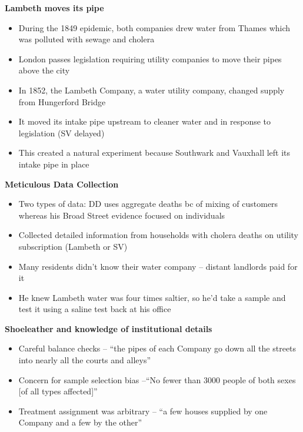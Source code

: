 \documentclass[notes=show]{beamer}
\begin{document}
\begin{frame}[plain]
\begin{center}
\textbf{Lambeth moves its pipe}
\end{center}

\begin{itemize}
\item During the 1849 epidemic, both companies drew water from Thames which was polluted with sewage and cholera
\item London passes legislation requiring utility companies to move their pipes above the city
\item In 1852, the Lambeth Company, a water utility company, changed supply from Hungerford Bridge
\item It moved its intake pipe upstream to cleaner water and in response to legislation (SV delayed)
\item This created a natural experiment because Southwark and Vauxhall left its intake pipe in place
\end{itemize}

\end{frame}



\begin{frame}[plain]
\begin{center}
\textbf{Meticulous Data Collection}
\end{center}

\begin{itemize}
\item Two types of data: DD uses aggregate deaths bc of mixing of customers whereas his Broad Street evidence focused on individuals
\item Collected detailed information from households with cholera deaths on utility subscription (Lambeth or SV)
\item Many residents didn't know their water company -- distant landlords paid for it
\item He knew Lambeth water was four times saltier, so he'd take a sample and test it using a saline test back at his office
\end{itemize}

\end{frame}


\begin{frame}[plain]
\begin{center}
\textbf{Shoeleather and knowledge of institutional details}
\end{center}

\begin{itemize}
\item Careful balance checks -- ``the pipes of each Company go down all the streets into nearly all the courts and alleys''
\item Concern for sample selection bias --``No fewer than 3000 people of both sexes [of all types affected]''
\item Treatment assignment was arbitrary -- ``a few houses supplied by one Company and a few by the other''
\end{itemize}

\end{frame}
\end{document}
